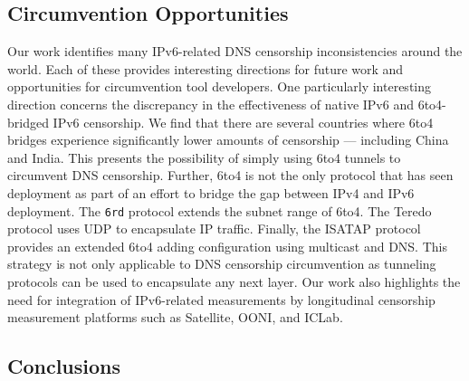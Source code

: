 
\subsection{Circumvention Opportunities}
\label{sec:v4vsv6-discussion:future}
Our work identifies many IPv6-related DNS censorship inconsistencies around the
world. Each of these provides interesting directions for future work and
opportunities for circumvention tool developers.
%
One particularly interesting direction concerns the discrepancy in the
effectiveness of native IPv6 and 6to4-bridged IPv6 censorship. We find that
there are several countries where 6to4 bridges experience significantly lower
amounts of censorship --- including China and India. This presents the
possibility of simply using 6to4 tunnels to circumvent DNS censorship. 
%
Further, 6to4 is not the only protocol that has seen deployment as part of an
effort to bridge the gap between IPv4 and IPv6 deployment. The \texttt{6rd}
protocol extends the subnet range of 6to4. The Teredo protocol uses UDP to
encapsulate IP traffic. Finally, the ISATAP protocol provides an extended 6to4
adding configuration using multicast and DNS. This strategy is not only
applicable to DNS censorship circumvention as tunneling protocols can be used to
encapsulate any next layer.
%
Our work also highlights the need for integration of IPv6-related measurements
by longitudinal censorship measurement platforms such as Satellite, OONI, and
ICLab. 

\subsection{Conclusions} \label{sec:v4vsv6-discussion:conclusions}

